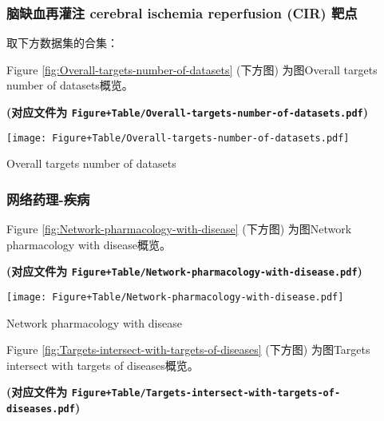 \documentclass[
]{article}
\begin{document}
\hypertarget{ux8111ux7f3aux8840ux518dux704cux6ce8-cerebral-ischemia-reperfusion-cir-ux9776ux70b9}{%
\subsubsection{脑缺血再灌注 cerebral ischemia reperfusion (CIR) 靶点}\label{ux8111ux7f3aux8840ux518dux704cux6ce8-cerebral-ischemia-reperfusion-cir-ux9776ux70b9}}

取下方数据集的合集：

Figure \ref{fig:Overall-targets-number-of-datasets} (下方图) 为图Overall targets number of datasets概览。

\textbf{(对应文件为 \texttt{Figure+Table/Overall-targets-number-of-datasets.pdf})}

\def\@captype{figure}
\begin{center}
\texttt{[image: Figure+Table/Overall-targets-number-of-datasets.pdf]}
\caption{Overall targets number of datasets}\label{fig:Overall-targets-number-of-datasets}
\end{center}

\hypertarget{ux7f51ux7edcux836fux7406-ux75beux75c5}{%
\subsubsection{网络药理-疾病}\label{ux7f51ux7edcux836fux7406-ux75beux75c5}}

Figure \ref{fig:Network-pharmacology-with-disease} (下方图) 为图Network pharmacology with disease概览。

\textbf{(对应文件为 \texttt{Figure+Table/Network-pharmacology-with-disease.pdf})}

\def\@captype{figure}
\begin{center}
\texttt{[image: Figure+Table/Network-pharmacology-with-disease.pdf]}
\caption{Network pharmacology with disease}\label{fig:Network-pharmacology-with-disease}
\end{center}

Figure \ref{fig:Targets-intersect-with-targets-of-diseases} (下方图) 为图Targets intersect with targets of diseases概览。

\textbf{(对应文件为 \texttt{Figure+Table/Targets-intersect-with-targets-of-diseases.pdf})}
\end{document}
